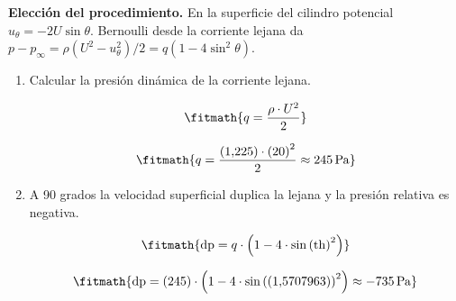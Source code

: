 \noindent\textbf{Elección del procedimiento.} En la superficie del cilindro potencial $u_\theta=-2U\sin\theta$. Bernoulli desde la corriente lejana da $p-p_\infty=\rho(U^2-u_\theta^2)/2=q(1-4\sin^2\theta)$.

\begin{enumerate}

\item Calcular la presión dinámica de la corriente lejana.

\[\fitmath{q=\frac{\rho\cdot {U}^{2}}{2}}\]

\[\fitmath{q=\frac{(1{,}225)\cdot {(20)}^{2}}{2}\approx 245\,\mathrm{Pa}}\]

\item A 90 grados la velocidad superficial duplica la lejana y la presión relativa es negativa.

\[\fitmath{\mathrm{dp}=q\cdot \left(1-4\cdot {\sin\left(\mathrm{th}\right)}^{2}\right)}\]

\[\fitmath{\mathrm{dp}=(245)\cdot \left(1-4\cdot {\sin\left((1{,}5707963)\right)}^{2}\right)\approx -735\,\mathrm{Pa}}\]

\end{enumerate}
